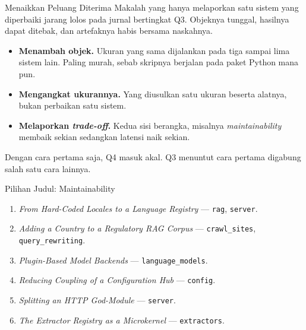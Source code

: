 \documentclass[aspectratio=169, table, 12pt]{beamer}
\begin{document}
\begin{frame}{{\Large Menaikkan Peluang Diterima}}
  \vspace{8pt}
  {\small Makalah yang hanya melaporkan satu sistem yang diperbaiki jarang
  lolos pada jurnal bertingkat Q3. Objeknya tunggal, hasilnya dapat ditebak,
  dan artefaknya habis bersama naskahnya.}

  \vspace{6pt}
  \begin{itemize}\small
    \item \textbf{Menambah objek.} Ukuran yang sama dijalankan pada tiga
          sampai lima sistem lain. Paling murah, sebab skripnya berjalan pada
          paket Python mana pun.
    \item \textbf{Mengangkat ukurannya.} Yang diusulkan satu ukuran beserta
          alatnya, bukan perbaikan satu sistem.
    \item \textbf{Melaporkan \textit{trade-off}.} Kedua sisi berangka,
          misalnya \textit{maintainability} membaik sekian sedangkan latensi
          naik sekian.
  \end{itemize}

  \vspace{4pt}
  {\small Dengan cara pertama saja, Q4 masuk akal. Q3 menuntut cara pertama
  digabung salah satu cara lainnya.}
\end{frame}

\begin{frame}{{\Large Pilihan Judul: Maintainability}}
  \vspace{8pt}
  \begin{enumerate}\small
    \item \textit{From Hard-Coded Locales to a Language Registry} —
          \texttt{rag}, \texttt{server}.
    \item \textit{Adding a Country to a Regulatory RAG Corpus} —
          \texttt{crawl\_sites}, \texttt{query\_rewriting}.
    \item \textit{Plugin-Based Model Backends} — \texttt{language\_models}.
    \item \textit{Reducing Coupling of a Configuration Hub} — \texttt{config}.
    \item \textit{Splitting an HTTP God-Module} — \texttt{server}.
    \item \textit{The Extractor Registry as a Microkernel} —
          \texttt{extractors}.
  \end{enumerate}
\end{frame}
\end{document}
